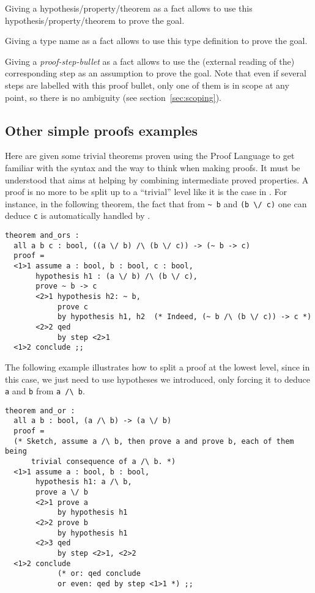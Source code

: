 Giving a hypothesis/property/theorem as a fact allows {\zenon} to use
this hypothesis/property/theorem to prove the goal.

Giving a type name as a fact allows {\zenon} to use this type definition to
prove the goal.

Giving a {\em proof-step-bullet} as a fact allows {\zenon} to use the
(external reading of the) corresponding step as an assumption to prove the
goal. Note that even if several steps are labelled with this proof bullet,
only one of them is in scope at any point, so there is no ambiguity (see
section~\ref{sec:scoping}).


\subsection{Other simple proofs examples}

Here are given some trivial theorems proven using the {\focal} Proof
Language to get familiar with the syntax and the way to think when
making proofs. It must be understood that {\zenon} aims at helping by
combining intermediate proved properties. A proof is no more to be
split up to a ``trivial'' level like it is the case in {\coq}. For
instance, in the following theorem, the fact that from \verb"~ b" and
\verb"(b \/ c)" one can deduce \verb"c" is automatically handled by
{\zenon}.

{\scriptsize
\begin{lstlisting}
theorem and_ors :
  all a b c : bool, ((a \/ b) /\ (b \/ c)) -> (~ b -> c)
  proof =
  <1>1 assume a : bool, b : bool, c : bool,
       hypothesis h1 : (a \/ b) /\ (b \/ c),
       prove ~ b -> c
       <2>1 hypothesis h2: ~ b,
            prove c
            by hypothesis h1, h2  (* Indeed, (~ b /\ (b \/ c)) -> c *)
       <2>2 qed
            by step <2>1
  <1>2 conclude ;;
\end{lstlisting}}

The following example illustrates how to split a proof at the lowest
level, since in this case, we just need {\zenon} to use hypotheses we
introduced, only forcing it to deduce \verb"a" and \verb"b" from
\verb"a /\ b".

{\scriptsize
\begin{lstlisting}
theorem and_or :
  all a b : bool, (a /\ b) -> (a \/ b)
  proof =
  (* Sketch, assume a /\ b, then prove a and prove b, each of them being
      trivial consequence of a /\ b. *)
  <1>1 assume a : bool, b : bool,
       hypothesis h1: a /\ b,
       prove a \/ b
       <2>1 prove a
            by hypothesis h1
       <2>2 prove b
            by hypothesis h1
       <2>3 qed
            by step <2>1, <2>2
  <1>2 conclude
            (* or: qed conclude
            or even: qed by step <1>1 *) ;;
\end{lstlisting}}


